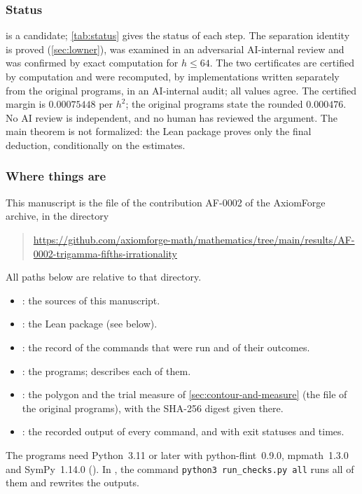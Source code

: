 \sloppy

\subsubsection*{Status}
 is a candidate; \cref{tab:status} gives the status of each step. The separation
identity is proved (\cref{sec:lowner}), was examined in an adversarial AI-internal review and was
confirmed by exact computation for $h\le64$. The two certificates are certified by computation and
were recomputed, by implementations written separately from the original programs, in an
AI-internal audit; all values agree. The certified margin is $0.00075448$ per $h^2$; the original
programs state the rounded $0.000476$. No AI review is independent, and no human has reviewed the
argument. The main theorem is not formalized: the Lean package proves only the final deduction,
conditionally on the estimates.

\subsubsection*{Where things are}
This manuscript is the file  of the contribution AF-0002 of the AxiomForge
archive, in the directory
\begin{quote}\small
\url{https://github.com/axiomforge-math/mathematics/tree/main/results/AF-0002-trigamma-fifths-irrationality}
\end{quote}
All paths below are relative to that directory.
\begin{itemize}
  \item {}: the sources of this manuscript.
  \item {}: the Lean package (see below).
  \item {}: the record of the commands that were run and of their
  outcomes.
  \item {}: the programs;  describes
  each of them.
  \item {}: the polygon and the trial
  measure of \cref{sec:contour-and-measure} (the file  of the original programs),
  with the SHA-256 digest given there.
  \item {}: the recorded output of every command, and
   with exit statuses and times.
\end{itemize}
The programs need Python~3.11 or later with python-flint~0.9.0, mpmath~1.3.0 and SymPy~1.14.0
(). In , the command
\texttt{python3 run\_checks.py all} runs all of them and rewrites the outputs.

